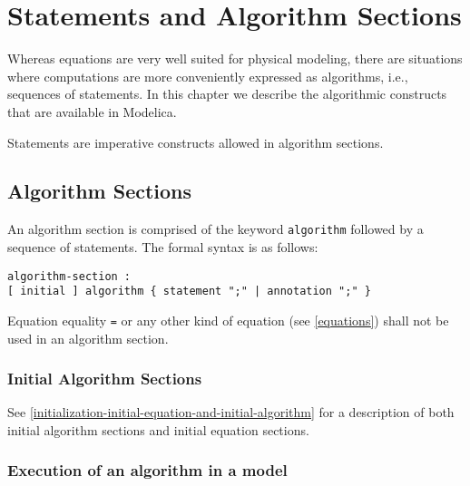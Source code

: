 \chapter{Statements and Algorithm Sections}\label{statements-and-algorithm-sections}

Whereas equations are very well suited for physical modeling, there are
situations where computations are more conveniently expressed as
algorithms, i.e., sequences of statements. In this chapter we describe
the algorithmic constructs that are available in Modelica.

Statements are imperative constructs allowed in algorithm sections.

\section{Algorithm Sections}\label{algorithm-sections}

An algorithm section is comprised of the keyword \lstinline!algorithm! followed by a
sequence of statements. The formal syntax is as follows:
\begin{lstlisting}[language=grammar]
algorithm-section :
[ initial ] algorithm { statement ";" | annotation ";" }
\end{lstlisting}

Equation equality \lstinline!=! or any other kind of equation (see \cref{equations}) shall
not be used in an algorithm section.

\subsection{Initial Algorithm Sections}\label{initial-algorithm-sections}

See \cref{initialization-initial-equation-and-initial-algorithm} for a description of both initial algorithm sections and
initial equation sections.

\subsection{Execution of an algorithm in a model}\label{execution-of-an-algorithm-in-a-model}


